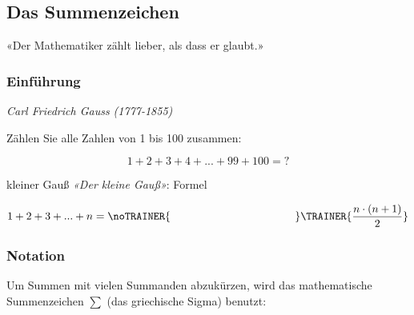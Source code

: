 %
%

\subsection{Das Summenzeichen}\label{Summenzeichen}
«Der Mathematiker zählt lieber, als dass er glaubt.»
\vspace{4mm}



\newpage


\subsubsection{Einführung}

\begin{center}\textit{Carl Friedrich Gauss (1777-1855)}\end{center}


Zählen Sie alle Zahlen von 1 bis 100 zusammen:

$$1+2+3+4+...+99+100 = ?$$


\begin{gesetz}{kleiner Gauß}{}
\textit{«Der kleine Gauß»}: Formel

$$1+2+3+...+n = \noTRAINER{\hspace{4cm}}\TRAINER{\frac{n\cdot{}(n+1)}2}$$
\end{gesetz}

\newpage

\subsubsection{Notation}
Um Summen mit vielen Summanden abzukürzen, wird das mathematische
Summenzeichen  $\sum{}$ (das griechische Sigma) benutzt:

